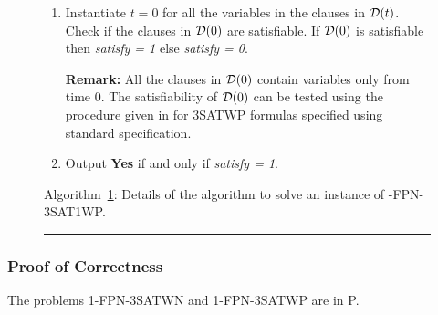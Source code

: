 {\begin{figure}[tbp]
\begin{enumerate}
\begin{enumerate}
\begin{enumerate}
\item
$ j = j+1$

\noindent
{\bf Remark:} The formula $F^{\infty}$ as a result
of modification is given by 
\[ F_j^{\infty} = F_{j-1}^{\infty}(v[x_i(t)] = 1,~ 1 \leq t \leq m) 
\bigcup {\cal D}(t) - \left(\bigwedge_{t}N_{x_i}(t, t+1) 
\bigwedge_{t}P_{x_i}(t, t+1) \right) 
\bigcup \left(\bigwedge_{t}N'_{x_i}(t, t+1) \right) \]


\end{enumerate}

\item
If the formula $F = \phi$, then set {\em satisfy = 1} and {\em flag = 1}.

\end{enumerate}

\item
Instantiate $t = 0$ for all the variables in the clauses in ${\cal D}(t)$.
Check if the clauses in ${\cal D}(0)$ are satisfiable. 
If ${\cal D}(0)$ is satisfiable then {\em satisfy = 1} else {\em satisfy = 0}.

\noindent
{\bf Remark:} All the clauses in ${\cal D}(0)$ contain variables only 
from time 0. The satisfiability of ${\cal D}(0)$  can be tested using the
procedure given in \cite{Pa94} for {\sf 3SATWP} formulas specified using
standard specification.


\item
Output {\bf Yes} if and only if {\em satisfy = 1}.


\end{enumerate}
\label{1fpn3satwp:alg}
\begin{center}
Algorithm~\ref{1fpn3satwp:alg}: 
Details of the algorithm to solve an instance of 
{-FPN-3SAT1WP}.
\end{center}
\vspace*{-.2in}
\rule{16.4cm}{0.01in}
\end{figure}
}


\newspacing


\subsubsection{Proof of Correctness}
\begin{theorem}\label{th:fpn3satwneasy}
The problems 1-FPN-3SATWN and  1-FPN-3SATWP are  in P.
\end{theorem}


